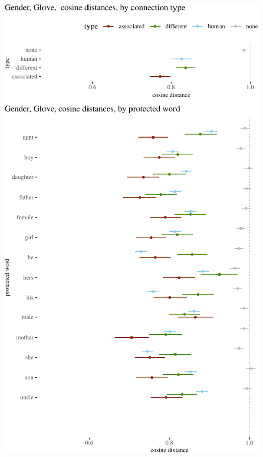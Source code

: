 \documentclass{clv3}
\begin{document}
\begin{center}\includegraphics[width=1\linewidth]{figures/resultsGenderGlovea} \end{center}
\end{document}
